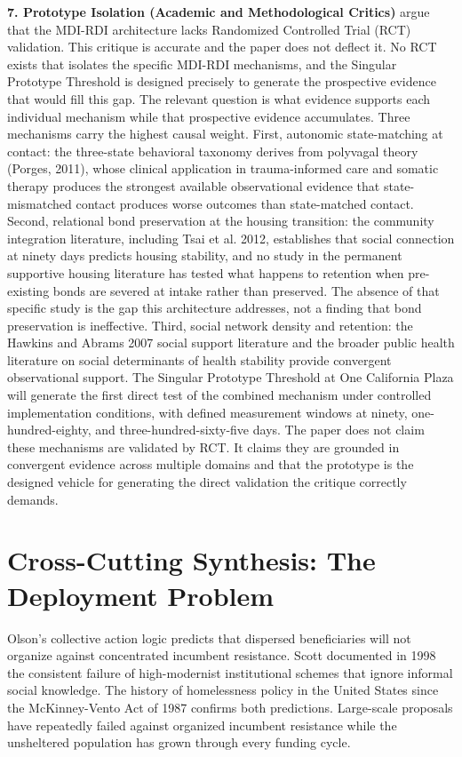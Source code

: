 \documentclass[12pt, letterpaper]{article}
\begin{document}
\textbf{7. Prototype Isolation (Academic and Methodological Critics)} argue that the MDI-RDI architecture lacks Randomized Controlled Trial (RCT) validation. This critique is accurate and the paper does not deflect it. No RCT exists that isolates the specific MDI-RDI mechanisms, and the Singular Prototype Threshold is designed precisely to generate the prospective evidence that would fill this gap. The relevant question is what evidence supports each individual mechanism while that prospective evidence accumulates. Three mechanisms carry the highest causal weight. First, autonomic state-matching at contact: the three-state behavioral taxonomy derives from polyvagal theory (Porges, 2011), whose clinical application in trauma-informed care and somatic therapy produces the strongest available observational evidence that state-mismatched contact produces worse outcomes than state-matched contact. Second, relational bond preservation at the housing transition: the community integration literature, including Tsai et al. 2012, establishes that social connection at ninety days predicts housing stability, and no study in the permanent supportive housing literature has tested what happens to retention when pre-existing bonds are severed at intake rather than preserved. The absence of that specific study is the gap this architecture addresses, not a finding that bond preservation is ineffective. Third, social network density and retention: the Hawkins and Abrams 2007 social support literature and the broader public health literature on social determinants of health stability provide convergent observational support. The Singular Prototype Threshold at One California Plaza will generate the first direct test of the combined mechanism under controlled implementation conditions, with defined measurement windows at ninety, one-hundred-eighty, and three-hundred-sixty-five days. The paper does not claim these mechanisms are validated by RCT. It claims they are grounded in convergent evidence across multiple domains and that the prototype is the designed vehicle for generating the direct validation the critique correctly demands.

\section{Cross-Cutting Synthesis: The Deployment Problem}
 Olson's collective action logic predicts that dispersed beneficiaries will not organize against concentrated incumbent resistance. Scott documented in 1998 the consistent failure of high-modernist institutional schemes that ignore informal social knowledge. The history of homelessness policy in the United States since the McKinney-Vento Act of 1987 confirms both predictions. Large-scale proposals have repeatedly failed against organized incumbent resistance while the unsheltered population has grown through every funding cycle.
\end{document}
